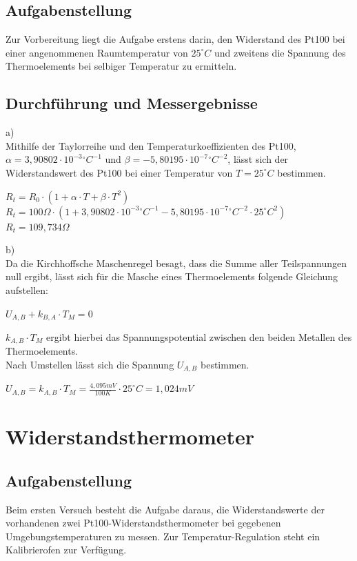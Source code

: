 \documentclass[a4paper,11pt,oneside]{article}
\begin{document}
\subsection{Aufgabenstellung}
Zur Vorbereitung liegt die Aufgabe erstens darin, den Widerstand des Pt100 bei einer angenommenen Raumtemperatur von $25^ \circ C$ und zweitens die Spannung des Thermoelements bei selbiger Temperatur zu ermitteln.
\subsection{Durchführung und Messergebnisse}
a)\\
Mithilfe der Taylorreihe und den Temperaturkoeffizienten des Pt100, $\alpha = 3,90802   \cdot 10^{-3} {}^\circ C^{-1}$ und $\beta = -5,80195 \cdot 10^{-7} {}^\circ C^{-2}$, lässt sich der Widerstandswert des Pt100 bei einer Temperatur von $T = 25^\circ C$ bestimmen.

\begin{center}
$R_t = R_0 \cdot (1 + \alpha \cdot T + \beta \cdot T^2)$ \\
$R_t = 100 \Omega \cdot (1 + 3,90802 \cdot 10^{-3} {}^\circ C^{-1} - 5,80195 \cdot 10^{-7}{}^\circ C ^{-2} \cdot 25 ^\circ C ^2)$ \\
$R_t = 109,734 \Omega$
\end{center}
b)\\
Da die Kirchhoffsche Maschenregel besagt, dass die Summe aller Teilspannungen null ergibt, lässt sich für die Masche eines Thermoelements folgende Gleichung aufstellen: 
\begin{center}
$U_{A,B} + k_{B,A} \cdot T_M = 0$
\end{center}
$k_{A,B} \cdot T_M$ ergibt hierbei das Spannungspotential zwischen den beiden Metallen des Thermoelements.\\
Nach Umstellen lässt sich die Spannung $U_{A,B}$ bestimmen.
\begin{center}
$U_{A,B} = k_{A,B} \cdot T_M = \frac{4,095mV}{100K} \cdot 25^\circ C = 1,024mV$
\end{center}

\newpage

\section{Widerstandsthermometer}
\subsection{Aufgabenstellung}
Beim ersten Versuch besteht die Aufgabe daraus, die Widerstandswerte der vorhandenen zwei Pt100-Widerstandsthermometer bei gegebenen Umgebungstemperaturen zu messen. Zur Temperatur-Regulation steht ein Kalibrierofen zur Verfügung. \\
\end{document}
